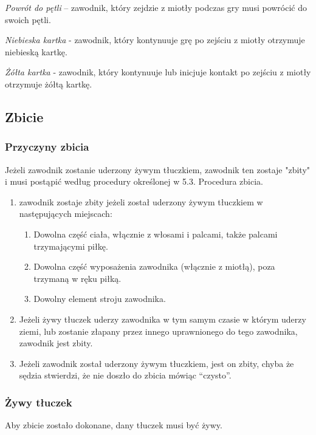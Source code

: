 \documentclass[12pt]{article}
\begin{document}
\emph{Powrót do pętli} -- zawodnik, który zejdzie z miotły podczas gry
musi powrócić do swoich pętli.

\emph{Niebieska kartka} - zawodnik, który kontynuuje grę po zejściu z
miotły otrzymuje niebieską kartkę.

\emph{Żółta kartka} - zawodnik, który kontynuuje lub inicjuje kontakt po
zejściu z miotły otrzymuje żółtą kartkę.

\subsection{Zbicie}

\subsubsection{Przyczyny zbicia}

Jeżeli zawodnik zostanie uderzony żywym tłuczkiem, zawodnik ten zostaje
"zbity" i musi postąpić
według procedury określonej w 5.3. Procedura zbicia.

\begin{enumerate}
\item
  zawodnik zostaje zbity jeżeli został uderzony żywym tłuczkiem w
  następujących miejscach:

  \begin{enumerate}
  \item
        Dowolna część ciała, włącznie z włosami i palcami, także palcami
    trzymającymi piłkę.
      \item
        Dowolna część wyposażenia zawodnika (włącznie z miotłą), poza
    trzymaną w ręku piłką.
      \item
        Dowolny element stroju zawodnika.
      \end{enumerate}
\item
    Jeżeli żywy tłuczek uderzy zawodnika w tym samym czasie w którym
  uderzy ziemi, lub zostanie złapany przez innego uprawnionego do tego
  zawodnika, zawodnik jest zbity.
  \item
    Jeżeli zawodnik został uderzony żywym tłuczkiem, jest on zbity, chyba
  że sędzia stwierdzi, że nie doszło do zbicia mówiąc ``czysto''.
  \end{enumerate}

\subsubsection{Żywy tłuczek}

Aby zbicie zostało dokonane, dany tłuczek musi być żywy.
\end{document}
